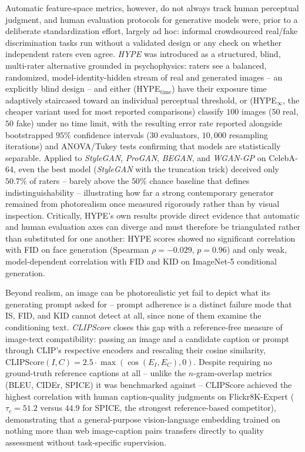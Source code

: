 Automatic feature-space metrics, however, do not always track human perceptual judgment, and human evaluation protocols for generative models were, prior to a deliberate standardization effort, largely ad hoc: informal crowdsourced real/fake discrimination tasks run without a validated design or any check on whether independent raters even agree. \textit{HYPE} \cite{zhouHYPEBenchmarkHuman2019} was introduced as a structured, blind, multi-rater alternative grounded in psychophysics: raters see a balanced, randomized, model-identity-hidden stream of real and generated images -- an explicitly blind design -- and either (HYPE$_{\mathrm{time}}$) have their exposure time adaptively staircased toward an individual perceptual threshold, or (HYPE$_\infty$, the cheaper variant used for most reported comparisons) classify $100$ images ($50$ real, $50$ fake) under no time limit, with the resulting error rate reported alongside bootstrapped $95\%$ confidence intervals ($30$ evaluators, $10{,}000$ resampling iterations) and ANOVA/Tukey tests confirming that models are statistically separable. Applied to \textit{StyleGAN}, \textit{ProGAN}, \textit{BEGAN}, and \textit{WGAN-GP} on CelebA-$64$, even the best model (\textit{StyleGAN} with the truncation trick) deceived only $50.7\%$ of raters -- barely above the $50\%$ chance baseline that defines indistinguishability -- illustrating how far a strong contemporary generator remained from photorealism once measured rigorously rather than by visual inspection. Critically, HYPE's own results provide direct evidence that automatic and human evaluation axes can diverge and must therefore be triangulated rather than substituted for one another: HYPE scores showed no significant correlation with FID on face generation (Spearman $\rho=-0.029$, $p=0.96$) and only weak, model-dependent correlation with FID and KID on ImageNet-5 conditional generation.

Beyond realism, an image can be photorealistic yet fail to depict what its generating prompt asked for -- prompt adherence is a distinct failure mode that IS, FID, and KID cannot detect at all, since none of them examine the conditioning text. \textit{CLIPScore} \cite{hesselCLIPScoreReferencefreeEvaluation2021} closes this gap with a reference-free measure of image-text compatibility: passing an image and a candidate caption or prompt through CLIP's respective encoders and rescaling their cosine similarity, $\mathrm{CLIPScore}(I,C) = 2.5 \cdot \max(\cos(E_I, E_C), 0)$. Despite requiring no ground-truth reference captions at all -- unlike the $n$-gram-overlap metrics (BLEU, CIDEr, SPICE) it was benchmarked against -- CLIPScore achieved the highest correlation with human caption-quality judgments on Flickr8K-Expert ($\tau_c=51.2$ versus $44.9$ for SPICE, the strongest reference-based competitor), demonstrating that a general-purpose vision-language embedding trained on nothing more than web image-caption pairs transfers directly to quality assessment without task-specific supervision.

